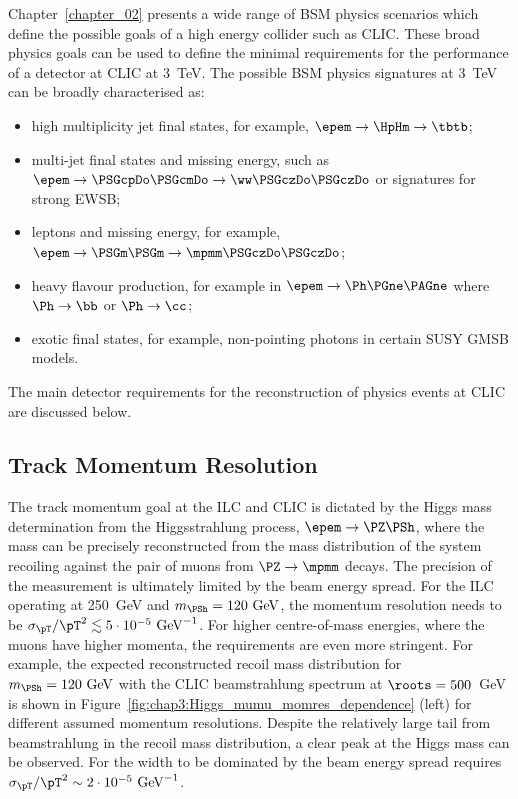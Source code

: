 Chapter~\ref{chapter_02} presents a wide range of \acs{BSM} physics scenarios which
define the possible goals of a high energy \epem collider such as CLIC\@. These
broad physics goals can be used to define the minimal requirements for the
performance of a detector at CLIC at 3~TeV. The possible BSM physics signatures
at 3~TeV can be broadly characterised as:
\begin{itemize}
 \item high multiplicity jet final states, for example, $\epem\rightarrow\HpHm \rightarrow \tbtb$;
 \item multi-jet final states and missing energy, such as $\epem\rightarrow\PSGcpDo\PSGcmDo\rightarrow\ww \PSGczDo\PSGczDo$ 
 or signatures for strong \acs{EWSB};
 \item leptons and missing energy, for example, $\epem\rightarrow\PSGm\PSGm\rightarrow\mpmm\PSGczDo\PSGczDo$;
 \item heavy flavour production, for example in $\epem\rightarrow \Ph \PGne\PAGne$ where $\Ph\rightarrow\bb$ or $\Ph\rightarrow\cc$; 
 \item exotic final states, for example, non-pointing photons in certain
 \acs{SUSY} \acs{GMSB} models.
\end{itemize} 
The main detector requirements for the reconstruction of physics events at CLIC are discussed below.


\subsection{Track Momentum Resolution\label{sec:chapter3:requirements:momentum}}

The track momentum goal at the ILC and CLIC is dictated by the Higgs mass determination
from the Higgsstrahlung process, $\epem \rightarrow \PZ\PSh$, where the mass can
be precisely reconstructed from the mass distribution of the system recoiling
against the pair of muons from $\PZ\rightarrow\mpmm$ decays. The precision of
the measurement is ultimately limited by the beam energy spread. For the
\acs{ILC} operating at 250~GeV and $m_{\PSh} = 120~\mathrm{GeV}$, the momentum resolution needs
to be $\sigma_{\pT}/\pT^2 \lesssim 5\cdot 10^{-5}~\mathrm{GeV}^{-1}$. For higher
centre-of-mass energies, where the muons have higher momenta, the requirements
are even more stringent. For example, the expected reconstructed recoil mass
distribution for $m_{\PSh}=120~\mathrm{GeV}$ with the CLIC beamstrahlung spectrum at
$\roots=500$~GeV is shown in Figure~\ref{fig:chap3:Higgs_mumu_momres_dependence} (left) for different
assumed momentum resolutions. Despite the relatively large tail from beamstrahlung in the recoil
mass distribution, a clear peak at the Higgs mass can be
observed. For the width to be dominated by the beam energy spread requires
$\sigma_{\pT}/\pT^2 \sim 2\cdot 10^{-5}~\mathrm{GeV}^{-1}$.

